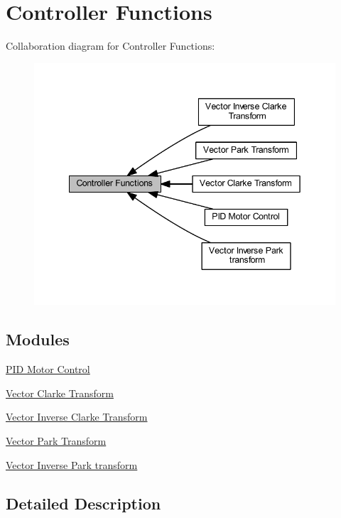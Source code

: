 \hypertarget{group__group_controller}{}\section{Controller Functions}
\label{group__group_controller}
Collaboration diagram for Controller Functions\+:
\nopagebreak
\begin{figure}[H]
\begin{center}
\leavevmode
\includegraphics[width=342pt]{group__group_controller}
\end{center}
\end{figure}
\subsection*{Modules}
\begin{DoxyCompactItemize}
\item 
\hyperlink{group___p_i_d}{P\+I\+D Motor Control}
\item 
\hyperlink{group__clarke}{Vector Clarke Transform}
\item 
\hyperlink{group__inv__clarke}{Vector Inverse Clarke Transform}
\item 
\hyperlink{group__park}{Vector Park Transform}
\item 
\hyperlink{group__inv__park}{Vector Inverse Park transform}
\end{DoxyCompactItemize}


\subsection{Detailed Description}
